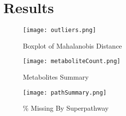 \documentclass{article}
\begin{document}
\section*{Results}



\begin{figure}
  \caption{Boxplot of Mahalanobis Distance}
  \texttt{[image: outliers.png]}
  \centering
  \label{fig:mahDist}
  \end{figure}

\begin{figure}
  \caption{Metabolites Summary}
  \texttt{[image: metaboliteCount.png]}
  \centering
  \label{fig:metabSum}
  \end{figure}

\begin{figure}
  \caption{\% Missing By Superpathway}
  \texttt{[image: pathSummary.png]}
  \centering
  \label{fig:pathMiss}
  \end{figure}
\end{document}
